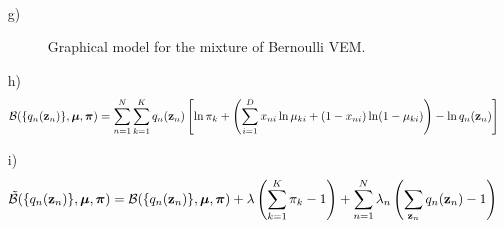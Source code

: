 \documentclass{amsmlaj}
\begin{document}
\begin{problem}
\begin{sol}
\begin{itemize}
\begin{align}
			\end{align}
		\item[g)] \hfill \vspace{-1cm}
			\begin{figure}[H]
				\centering
				\caption{Graphical model for the mixture of Bernoulli VEM.}
				\label{fig:bernvem}
			\end{figure}
		\item[h)] \hfill \vspace{-1cm}
			\begin{align}
				\mathcal{B}(\{q_n(\bm{\mathbf{z}}_n)\},\bm{\mathbf{\mu}},\bm{\mathbf{\pi}})
				&=\sum_{n=1}^N\sum_{k=1}^K q_n(\bm{\mathbf{z}}_n) \left[
					\ln\pi_k + \left(
					\sum_{i=1}^D x_{ni}\ln\mu_{ki}
					+(1-x_{ni})\ln(1-\mu_{ki})
					\right) - \ln q_n(\bm{\mathbf{z}}_n)
				\right]
			\end{align}
		\item[i)] \hfill \vspace{-1cm}
			\begin{align}
				\mathcal{\tilde{B}}(\{q_n(\bm{\mathbf{z}}_n)\},\bm{\mathbf{\mu}},\bm{\mathbf{\pi}})
				&=\mathcal{B}(\{q_n(\bm{\mathbf{z}}_n)\},\bm{\mathbf{\mu}},\bm{\mathbf{\pi}})
				+\lambda\left( \sum_{k=1}^K\pi_k - 1 \right)
				+\sum_{n=1}^N\lambda_n \left( \sum_{\bm{\mathbf{z}}_n}q_n(\bm{\mathbf{z}}_n) - 1 \right)
			\end{align}
	\end{itemize}
\end{sol}
\end{problem}
\end{document}
